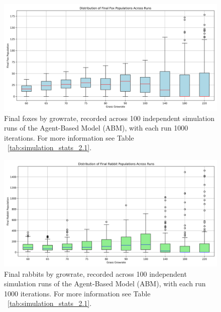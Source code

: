 \begin{figure}[!ht]
  \centering
  \includegraphics[width=0.9\linewidth]{images/boxplot_final_foxes_by_growrate_100.png}
  \caption{
    Final foxes by growrate, recorded across 100 independent simulation runs of the Agent-Based Model (ABM), with each run 1000 iterations. For more information see Table ~\ref{tab:simulation_stats_2.1}.
}
  \label{fig:boxplot_final_foxes_by_growrate_100_2.1}
\end{figure}





\begin{figure}[!ht]
  \centering
  \includegraphics[width=0.9\linewidth]{images/boxplot_final_rabbits_by_growrate_100.png}
  \caption{
    Final rabbits by growrate, recorded across 100 independent simulation runs of the Agent-Based Model (ABM), with each run 1000 iterations. For more information see Table ~\ref{tab:simulation_stats_2.1}.
}
  \label{fig:boxplot_final_rabbits_by_growrate_100_2.1}
\end{figure}


